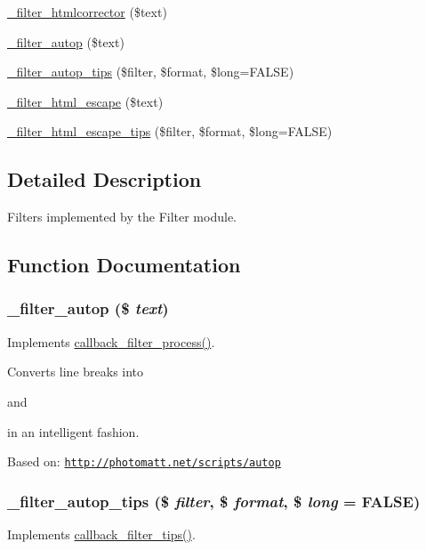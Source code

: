\begin{DoxyCompactItemize}
\item 
\hyperlink{group__standard__filters_ga3cb6607b3259ac8f9a83f317a63e3ec6}{\_\-filter\_\-htmlcorrector} (\$text)
\item 
\hyperlink{group__standard__filters_ga1dc1e116a15318077568b27534bd41bc}{\_\-filter\_\-autop} (\$text)
\item 
\hyperlink{group__standard__filters_ga21d7f6735341cc56c6e82dfe1d94eaf3}{\_\-filter\_\-autop\_\-tips} (\$filter, \$format, \$long=FALSE)
\item 
\hyperlink{group__standard__filters_ga5ea934ce6b9314fdb97a572fa3530631}{\_\-filter\_\-html\_\-escape} (\$text)
\item 
\hyperlink{group__standard__filters_gaea4abc943473d502360f1448bf66b1a2}{\_\-filter\_\-html\_\-escape\_\-tips} (\$filter, \$format, \$long=FALSE)
\end{DoxyCompactItemize}


\subsection{Detailed Description}
Filters implemented by the Filter module. 

\subsection{Function Documentation}
\hypertarget{group__standard__filters_ga1dc1e116a15318077568b27534bd41bc}{
\subsubsection[{\_\-filter\_\-autop}]{\setlength{\rightskip}{0pt plus 5cm}\_\-filter\_\-autop (\$ {\em text})}}
\label{group__standard__filters_ga1dc1e116a15318077568b27534bd41bc}
Implements \hyperlink{group__callbacks_ga5f82accd878d144a22ea2dfec253f91d}{callback\_\-filter\_\-process()}.

Converts line breaks into 

and \par
 in an intelligent fashion.

Based on: \href{http://photomatt.net/scripts/autop}{\tt http://photomatt.net/scripts/autop} \hypertarget{group__standard__filters_ga21d7f6735341cc56c6e82dfe1d94eaf3}{
\subsubsection[{\_\-filter\_\-autop\_\-tips}]{\setlength{\rightskip}{0pt plus 5cm}\_\-filter\_\-autop\_\-tips (\$ {\em filter}, \/  \$ {\em format}, \/  \$ {\em long} = {\ttfamily FALSE})}}
\label{group__standard__filters_ga21d7f6735341cc56c6e82dfe1d94eaf3}
Implements \hyperlink{group__callbacks_gabe5ee7c795e0adac0bccb8061006949e}{callback\_\-filter\_\-tips()}.


